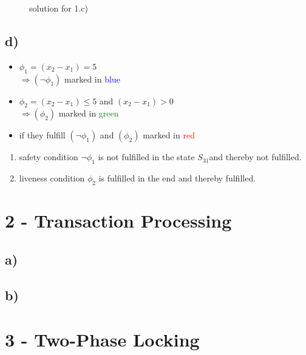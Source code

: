 \documentclass{scrartcl}
\begin{document}
\begin{figure}[!ht]
\caption{solution for 1.c)}
\end{figure}

\subsection*{d)}
\begin{itemize}
	\item $ \phi_{1} = (x_{2} - x_{1}) = 5 $\\
	$ \Rightarrow (\neg\phi_{1}) $ marked in \textcolor{blue}{blue}
	\item $ \phi_{2} = (x_{2} - x_{1}) \leq 5 $ and $ (x_{2} - x_{1}) > 0 $\\
	$ \Rightarrow (\phi_{2}) $ marked in \textcolor{green}{green}
	\item if they fulfill $ (\neg\phi_{1}) $ and $ (\phi_{2}) $ marked in \textcolor{red}{red}
\end{itemize}

\begin{enumerate}
	\item safety condition $ \neg\phi_{1} $ is not fulfilled in the state $ S_{31} $and thereby not fulfilled.
	\item liveness condition $ \phi_{2} $ is fulfilled in the end and thereby fulfilled.
\end{enumerate}
\section*{2 - Transaction Processing}
\subsection*{a)}
\subsection*{b)}

\section*{3 - Two-Phase Locking}
\end{document}
